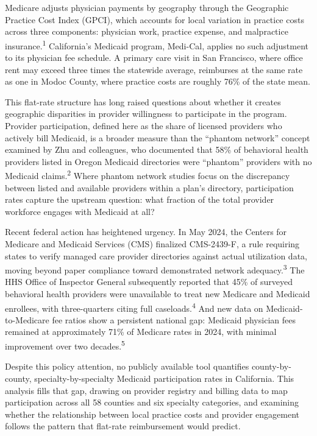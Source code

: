 \documentclass[12pt]{article}
\begin{document}
Medicare adjusts physician payments by geography through the Geographic Practice Cost Index (GPCI), which accounts for local variation in practice costs across three components: physician work, practice expense, and malpractice insurance.\textsuperscript{1} California's Medicaid program, Medi-Cal, applies no such adjustment to its physician fee schedule. A primary care visit in San Francisco, where office rent may exceed three times the statewide average, reimburses at the same rate as one in Modoc County, where practice costs are roughly 76\% of the state mean.

This flat-rate structure has long raised questions about whether it creates geographic disparities in provider willingness to participate in the program. Provider participation, defined here as the share of licensed providers who actively bill Medicaid, is a broader measure than the ``phantom network'' concept examined by Zhu and colleagues, who documented that 58\% of behavioral health providers listed in Oregon Medicaid directories were ``phantom'' providers with no Medicaid claims.\textsuperscript{2} Where phantom network studies focus on the discrepancy between listed and available providers within a plan's directory, participation rates capture the upstream question: what fraction of the total provider workforce engages with Medicaid at all?

Recent federal action has heightened urgency. In May 2024, the Centers for Medicare and Medicaid Services (CMS) finalized CMS-2439-F, a rule requiring states to verify managed care provider directories against actual utilization data, moving beyond paper compliance toward demonstrated network adequacy.\textsuperscript{3} The HHS Office of Inspector General subsequently reported that 45\% of surveyed behavioral health providers were unavailable to treat new Medicare and Medicaid enrollees, with three-quarters citing full caseloads.\textsuperscript{4} And new data on Medicaid-to-Medicare fee ratios show a persistent national gap: Medicaid physician fees remained at approximately 71\% of Medicare rates in 2024, with minimal improvement over two decades.\textsuperscript{5}

Despite this policy attention, no publicly available tool quantifies county-by-county, specialty-by-specialty Medicaid participation rates in California. This analysis fills that gap, drawing on provider registry and billing data to map participation across all 58 counties and six specialty categories, and examining whether the relationship between local practice costs and provider engagement follows the pattern that flat-rate reimbursement would predict.
\end{document}
